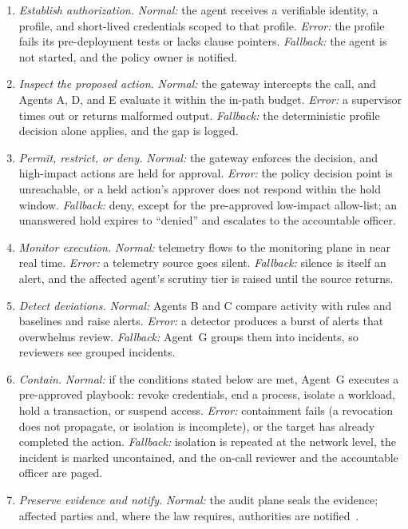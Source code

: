 \documentclass{ieeeaccess}
\begin{document}
\begin{enumerate}
  \item \textit{Establish authorization.} \textit{Normal:} the agent receives a verifiable identity, a profile, and short-lived credentials scoped to that profile. \textit{Error:} the profile fails its pre-deployment tests or lacks clause pointers. \textit{Fallback:} the agent is not started, and the policy owner is notified.
  \item \textit{Inspect the proposed action.} \textit{Normal:} the gateway intercepts the call, and Agents A, D, and E evaluate it within the in-path budget. \textit{Error:} a supervisor times out or returns malformed output. \textit{Fallback:} the deterministic profile decision alone applies, and the gap is logged.
  \item \textit{Permit, restrict, or deny.} \textit{Normal:} the gateway enforces the decision, and high-impact actions are held for approval. \textit{Error:} the policy decision point is unreachable, or a held action's approver does not respond within the hold window. \textit{Fallback:} deny, except for the pre-approved low-impact allow-list; an unanswered hold expires to ``denied'' and escalates to the accountable officer.
  \item \textit{Monitor execution.} \textit{Normal:} telemetry flows to the monitoring plane in near real time. \textit{Error:} a telemetry source goes silent. \textit{Fallback:} silence is itself an alert, and the affected agent's scrutiny tier is raised until the source returns.
  \item \textit{Detect deviations.} \textit{Normal:} Agents B and C compare activity with rules and baselines and raise alerts. \textit{Error:} a detector produces a burst of alerts that overwhelms review. \textit{Fallback:} Agent~G groups them into incidents, so reviewers see grouped incidents.
  \item \textit{Contain.} \textit{Normal:} if the conditions stated below are met, Agent~G executes a pre-approved playbook: revoke credentials, end a process, isolate a workload, hold a transaction, or suspend access. \textit{Error:} containment fails (a revocation does not propagate, or isolation is incomplete), or the target has already completed the action. \textit{Fallback:} isolation is repeated at the network level, the incident is marked uncontained, and the on-call reviewer and the accountable officer are paged.
  \item \textit{Preserve evidence and notify.} \textit{Normal:} the audit plane seals the evidence; affected parties and, where the law requires, authorities are notified~\cite{euaiact2024,nist2025incident}.

\end{enumerate}
\end{document}

